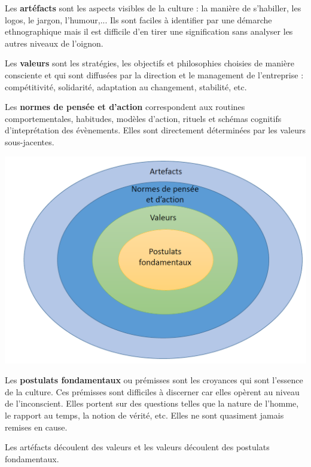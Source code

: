 \documentclass[12pt]{article}
\begin{document}
	  \begin{multicols}{2}
	  
	  Les \textbf{artéfacts} sont les aspects visibles de la culture : la manière de s'habiller, les logos, le jargon, l'humour,... Ils sont faciles à identifier par une démarche ethnographique mais il est difficile d'en tirer une signification sans analyser les autres niveaux de l'oignon.
	  
	  Les \textbf{valeurs} sont les stratégies, les objectifs et philosophies choisies de manière consciente et qui sont diffusées par la direction et le management de l'entreprise : compétitivité, solidarité, adaptation au changement, stabilité, etc.
	  
	  Les \textbf{normes de pensée et d'action} correspondent aux routines comportementales, habitudes, modèles d'action, rituels et schémas cognitifs d'inteprétation des évènements. Elles sont directement déterminées par les valeurs sous-jacentes.
	  	  
	  \begin{center}
	    \includegraphics[width=\linewidth]{culture_orga_niveaux.png}
	  \end{center}
	  Les \textbf{postulats fondamentaux} ou prémisses sont les croyances qui sont l'essence de la culture. Ces prémisses sont difficiles à discerner car elles opèrent au niveau de l'inconscient. Elles portent sur des questions telles que la nature de l'homme, le rapport au temps, la notion de vérité, etc. Elles ne sont quasiment jamais remises en cause.
	  
	  Les artéfacts découlent des valeurs et les valeurs découlent des postulats fondamentaux.
	  
	  \end{multicols}
	  
\end{document}
